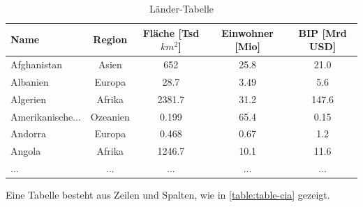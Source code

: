 \begin{table}[H]
  \centering
  \begin{tabular}{lcccc}
    \toprule
    \textbf{Name}    & \textbf{Region} & \textbf{Fläche [Tsd $km^2$]} & \textbf{Einwohner [Mio]} & \textbf{BIP [Mrd USD]} \\
    \midrule
    Afghanistan      & Asien           & 652             & 25.8             & 21.0        \\
    Albanien         & Europa          & 28.7            & 3.49              & 5.6         \\
    Algerien         & Afrika          & 2381.7         & 31.2              & 147.6       \\
    Amerikanische... & Ozeanien        & 0.199           & 65.4              & 0.15        \\
    Andorra          & Europa          & 0.468           & 0.67              & 1.2         \\
    Angola           & Afrika          & 1246.7         & 10.1              & 11.6        \\
    \midrule
    ...              & ...             & ...             & ...                & ...          \\
    \bottomrule
  \end{tabular}
  \caption{Länder-Tabelle}
  \label{table:cia-values}
\end{table}


Eine Tabelle besteht aus Zeilen und Spalten, wie in \cref{table:table-cia} gezeigt.


